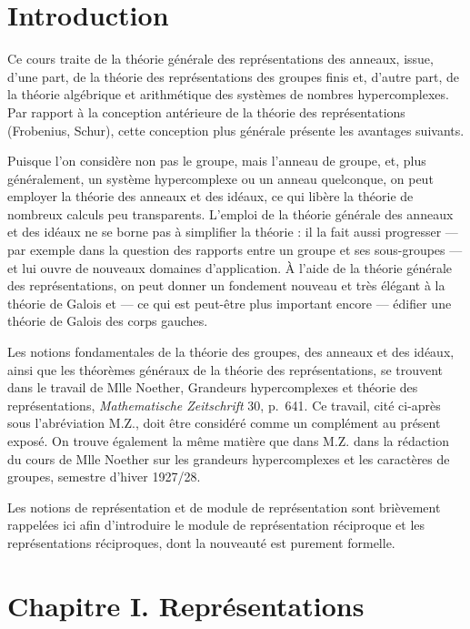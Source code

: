 
\section*{Introduction}\label{fr-r823-introduction}

Ce cours traite de la théorie générale des représentations des anneaux, issue, d'une part, de la théorie des représentations des groupes finis et, d'autre part, de la théorie algébrique et arithmétique des systèmes de nombres hypercomplexes. Par rapport à la conception antérieure de la théorie des représentations (Frobenius, Schur), cette conception plus générale présente les avantages suivants.

Puisque l'on considère non pas le groupe, mais l'anneau de groupe, et, plus généralement, un système hypercomplexe ou un anneau quelconque, on peut employer la théorie des anneaux et des idéaux, ce qui libère la théorie de nombreux calculs peu transparents. L'emploi de la théorie générale des anneaux et des idéaux ne se borne pas à simplifier la théorie : il la fait aussi progresser --- par exemple dans la question des rapports entre un groupe et ses sous-groupes --- et lui ouvre de nouveaux domaines d'application. À l'aide de la théorie générale des représentations, on peut donner un fondement nouveau et très élégant à la théorie de Galois et --- ce qui est peut-être plus important encore --- édifier une théorie de Galois des corps gauches.

Les notions fondamentales de la théorie des groupes, des anneaux et des idéaux, ainsi que les théorèmes généraux de la théorie des représentations, se trouvent dans le travail de Mlle Noether, \og Grandeurs hypercomplexes et théorie des représentations\fg{}, \emph{Mathematische Zeitschrift} 30, p.\ 641. Ce travail, cité ci-après sous l'abréviation M.Z., doit être considéré comme un complément au présent exposé. On trouve également la même matière que dans M.Z. dans la rédaction du cours de Mlle Noether sur les grandeurs hypercomplexes et les caractères de groupes, semestre d'hiver 1927/28.

Les notions de représentation et de module de représentation sont brièvement rappelées ici afin d'introduire le module de représentation réciproque et les représentations réciproques, dont la nouveauté est purement formelle.

\section*{Chapitre I. Représentations}\label{fr-r823-chapitre-i-representations}

